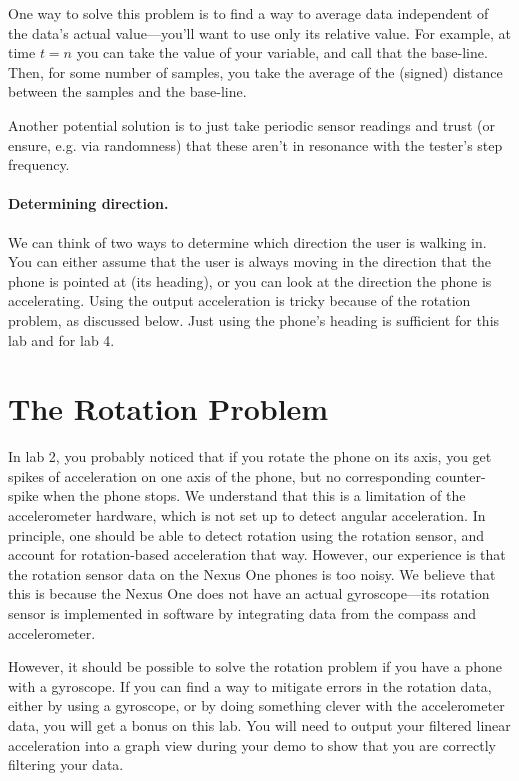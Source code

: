 \documentclass[10pt]{article}
\begin{document}
One way to solve this problem is to find a way to average data independent of the data's actual value---you'll want to use only its relative value. For example, at time $t=n$ you can take the value of your variable, and call that the base-line. Then, for some number of samples, you take the average of the (signed) distance between the samples and the base-line.

Another potential solution is to just take periodic sensor readings
and trust (or ensure, e.g. via randomness) that these aren't in
resonance with the tester's step frequency.

\paragraph{Determining direction.}
We can think of two ways to determine which direction the user is walking in. You can either assume that the user is always moving in the direction that the phone is pointed at (its heading), or you can look at the direction the phone is accelerating. Using the output acceleration is tricky because of the rotation problem, as discussed below. Just using the phone's heading is sufficient for this lab and for lab 4. 

\section{The Rotation Problem}
In lab 2, you probably noticed that if you rotate the phone on its axis, you get spikes of acceleration on one axis of the phone, but no corresponding counter-spike when the phone stops. We understand that this is a limitation of the accelerometer hardware, which is not set up to detect angular acceleration. In principle, one should be able to detect rotation using the rotation sensor, and account for rotation-based acceleration that way. However, our experience is that the rotation sensor data on the Nexus One phones is too noisy. We believe that this is because the Nexus One does not have an actual gyroscope---its rotation sensor is implemented in software by integrating data from the compass and accelerometer. 

However, it should be possible to solve the rotation problem if you have a phone with a gyroscope. If you can find a way to mitigate errors in the rotation data, either by using a gyroscope, or by doing something clever with the accelerometer data, you will get a bonus on this lab. You will need to output your filtered linear acceleration into a graph view during your demo to show that you are correctly filtering your data.
\end{document}
